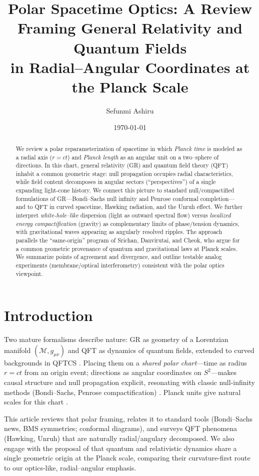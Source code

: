 \documentclass[12pt]{article}
\title{Polar Spacetime Optics: A Review Framing General Relativity and Quantum Fields\\
in Radial--Angular Coordinates at the Planck Scale}
\author{Sefunmi Ashiru}
\date{\today}
\newcommand{\M}{\mathcal{M}}
\newcommand{\g}{g}
\begin{document}
\maketitle

\begin{abstract}
We review a polar reparameterization of spacetime in which \emph{Planck time} is modeled as a radial axis ($r=ct$) and \emph{Planck length} as an angular unit on a two–sphere of directions. In this chart, general relativity (GR) and quantum field theory (QFT) inhabit a common geometric stage: null propagation occupies radial characteristics, while field content decomposes in angular sectors (``perspectives'') of a single expanding light-cone history. We connect this picture to standard null/compactified formulations of GR---Bondi–Sachs null infinity and Penrose conformal completion---and to QFT in curved spacetime, Hawking radiation, and the Unruh effect. We further interpret \emph{white-hole–like} dispersion (light as outward spectral flow) versus \emph{localized energy compactification} (gravity) as complementary limits of phase/tension dynamics, with gravitational waves appearing as angularly resolved ripples. The approach parallels the “same-origin” program of Srichan, Danvirutai, and Cheok, who argue for a common geometric provenance of quantum and gravitational laws at Planck scales. We summarize points of agreement and divergence, and outline testable analog experiments (membrane/optical interferometry) consistent with the polar optics viewpoint.
\end{abstract}

\tableofcontents

\section{Introduction}
Two mature formalisms describe nature: GR as geometry of a Lorentzian manifold $(\M,\g_{\mu\nu})$ and QFT as dynamics of quantum fields, extended to curved backgrounds in QFTCS \citep{BirrellDavies1982,ParkerToms2009,Carroll2003}. Placing them on a \emph{shared polar chart}---time as radius $r=ct$ from an origin event; directions as angular coordinates on $S^2$---makes causal structure and null propagation explicit, resonating with classic null-infinity methods (Bondi–Sachs, Penrose compactification) \citep{Bondi1962,Sachs1962,Penrose1964,NullInfinity,BMS,AsympFlat}. Planck units give natural scales for this chart \citep{PlanckUnits}.

This article reviews that polar framing, relates it to standard tools (Bondi–Sachs news, BMS symmetries; conformal diagrams), and surveys QFT phenomena (Hawking, Unruh) that are naturally radial/angulary decomposed. We also engage with the proposal of \citet{CheokInspire} that quantum and relativistic dynamics share a single geometric origin at the Planck scale, comparing their curvature-first route to our optics-like, radial–angular emphasis.
\end{document}
